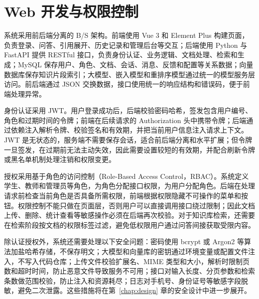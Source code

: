 \section{Web 开发与权限控制}
\label{sec:web-security}

系统采用前后端分离的 B/S 架构。前端使用 Vue 3 和 Element Plus 构建页面，负责登录、问答、引用展开、历史记录和管理后台等交互；后端使用 Python 与 FastAPI 提供 RESTful 接口，负责身份认证、业务逻辑、文档处理、检索和生成；MySQL 保存用户、角色、文档、会话、消息、反馈和配置等关系数据；向量数据库保存知识片段索引；大模型、嵌入模型和重排序模型通过统一的模型服务层访问。前后端通过 JSON 交换数据，接口使用统一的响应结构和错误码，便于前端处理异常。

身份认证采用 JWT。用户登录成功后，后端校验密码哈希，签发包含用户编号、角色和过期时间的令牌；前端在后续请求的 Authorization 头中携带令牌；后端通过依赖注入解析令牌、校验签名和有效期，并把当前用户信息注入请求上下文。JWT 是无状态的，服务端不需要保存会话，适合前后端分离和水平扩展；但令牌一旦签发，在过期前无法主动失效，因此需要设置较短的有效期，并配合刷新令牌或黑名单机制处理注销和权限变更。

授权采用基于角色的访问控制（Role-Based Access Control，RBAC）。系统定义学生、教师和管理员等角色，为角色分配接口权限，为用户分配角色。后端在处理请求前检查当前角色是否具备所需权限，前端根据权限隐藏不可操作的菜单和按钮。权限控制不能只做在页面层，否则用户可以直接调用接口绕过限制；因此文档上传、删除、统计查看等敏感操作必须在后端再次校验。对于知识库检索，还需要在检索阶段按文档的权限标签过滤，避免低权限用户通过问答间接获取受限内容。

除认证授权外，系统还需要处理以下安全问题：密码使用 bcrypt 或 Argon2 等算法加盐哈希存储，不保存明文；大模型和向量库的密钥通过环境变量或配置文件注入，不写入代码仓库；上传文件校验扩展名、MIME 类型和大小，解析时限制页数和超时时间，防止恶意文件导致服务不可用；接口对输入长度、分页参数和检索条数做范围校验，防止注入和资源耗尽；日志对手机号、身份证号等敏感字段脱敏，避免二次泄露。这些措施将在第~\ref{chap:design} 章的安全设计中进一步展开。
